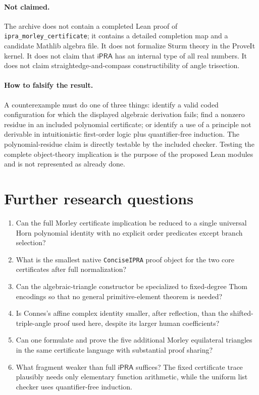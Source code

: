 \documentclass[11pt]{article}
\theoremstyle{definition}
\newcommand{\iPRA}{\mathsf{iPRA}}
\newcommand{\code}[1]{\texttt{#1}}
\begin{document}
\paragraph{Not claimed.}
The archive does not contain a completed Lean proof of
\code{ipra\_morley\_certificate}; it contains a detailed completion map and a
candidate Mathlib algebra file.  It does not formalize Sturm theory in the
ProveIt kernel.  It does not claim that $\iPRA$ has an internal type of all real
numbers.  It does not claim straightedge-and-compass constructibility of angle
trisection.

\paragraph{How to falsify the result.}
A counterexample must do one of three things: identify a valid coded
configuration for which the displayed algebraic derivation fails; find a
nonzero residue in an included polynomial certificate; or identify a use of a
principle not derivable in intuitionistic first-order logic plus
quantifier-free induction.  The polynomial-residue claim is directly testable
by the included checker.  Testing the complete object-theory implication is the
purpose of the proposed Lean modules and is not represented as already done.

\section{Further research questions}

\begin{enumerate}
\item Can the full Morley certificate implication be reduced to a single
universal Horn polynomial identity with no explicit order predicates except
branch selection?
\item What is the smallest native \code{ConciseIPRA} proof object for the two
core certificates after full normalization?
\item Can the algebraic-triangle constructor be specialized to fixed-degree
Thom encodings so that no general primitive-element theorem is needed?
\item Is Connes's affine complex identity smaller, after reflection, than the
shifted-triple-angle proof used here, despite its larger human coefficients?
\item Can one formulate and prove the five additional Morley equilateral
triangles in the same certificate language with substantial proof sharing?
\item What fragment weaker than full $\iPRA$ suffices?  The fixed certificate
trace plausibly needs only elementary function arithmetic, while the uniform
list checker uses quantifier-free induction.
\end{enumerate}
\end{document}
